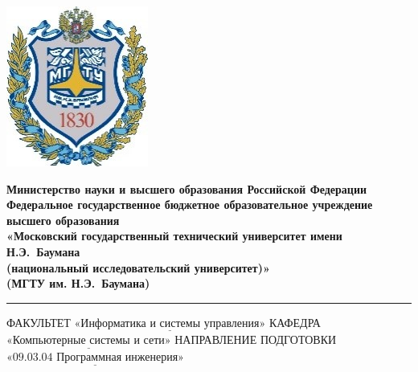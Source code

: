\documentclass[a4paper,12pt]{article}
\begin{document}
	\thispagestyle{empty}
	
	\noindent \begin{minipage}{0.15\textwidth}
		\includegraphics[width=\linewidth]{b_logo}
	\end{minipage}
	\noindent\begin{minipage}{0.9\textwidth}\centering
		\textbf{Министерство науки и высшего образования Российской Федерации}\\
		\textbf{Федеральное государственное бюджетное образовательное учреждение высшего образования}\\
		\textbf{«Московский государственный технический университет имени Н.Э.~Баумана}\\
		\textbf{(национальный исследовательский университет)»}\\
		\textbf{(МГТУ им. Н.Э.~Баумана)}
	\end{minipage}
	
	\noindent\rule{18cm}{3pt}
	\newline\newline
	\noindent ФАКУЛЬТЕТ $\underline{\text{«Информатика и системы управления»}}$ \newline\newline
	\noindent КАФЕДРА $\underline{\text{«Компьютерные системы и сети»}}$\newline\newline
	\noindent НАПРАВЛЕНИЕ ПОДГОТОВКИ $\underline{\text{«09.03.04 Программная инженерия»}}$\newline\newline\newline\newline\newline
	
\end{document}
